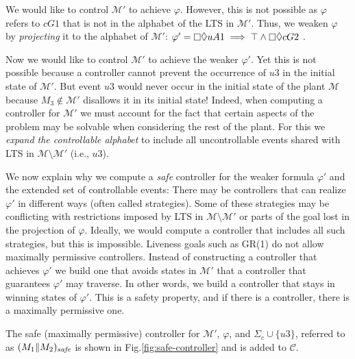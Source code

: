 We would like to  control $\mathcal{M}'$ to achieve $\varphi$. However, 
this is not possible as $\varphi$ refers to $cG1$ that is  not in the alphabet of the LTS in 
$\mathcal{M}'$. Thus, we weaken $\varphi$  by \textit{projecting} it to the alphabet of 
$\mathcal{M}'$:  $\varphi' = \always\eventually uA1 \implies \top 
\wedge \always\eventually cG2$ .%
 
 Now we would like to control $\mathcal{M}'$ to achieve the weaker 
  $\varphi'$. Yet this is not 
  possible because a controller cannot prevent the occurrence of $u3$ in the initial state 
  of $\mathcal{M}'$. 
 But event $u3$ would never occur in the initial state of the plant $\mathcal{M}$ 
 because $M_3 \not\in \mathcal{M'}$ disallows it in its initial state!  Indeed, when 
 computing a controller for $\mathcal{M'}$ we must account for the fact that certain 
 aspects of the problem may be solvable when considering the rest of the plant. For this 
 we \textit{expand the controllable alphabet} to include all uncontrollable events shared 
 with LTS 
 in $\mathcal{M} \setminus \mathcal{M'}$ (i.e., $u3$).
  

  
  We now explain why we compute a \textit{safe} controller for the weaker formula $\varphi'$ 
  and the extended set of controllable events:   There may be controllers that can realize 
  $\varphi'$ in different ways (often called strategies). Some of these strategies may be 
  conflicting with restrictions imposed by LTS in $\mathcal{M} \setminus \mathcal{M'}$ 
  or parts of the goal lost in the projection of $\varphi$.  Ideally, we would compute a 
  controller that includes all such strategies, but this is impossible. Liveness goals such as 
  GR(1) do not allow maximally permissive controllers. Instead  of constructing a 
  controller that achieves $\varphi'$ we build one that avoids states in $\mathcal{M}'$ 
  that a controller that guarantees   $\varphi'$ may traverse. In other words, we build a 
  controller that stays in winning states of $\varphi'$. This is a safety property, and if 
  there is a controller, there is a maximally permissive one. 
  
  The safe (maximally permissive) controller for $\mathcal{M'}$, $\varphi$, and 
  $\Sigma_c \cup \{u3\}$, referred to as $(M_1 \| M_2)_{\mbox{\textit{\scriptsize 
  safe}}}$    is 
  shown in 
  Fig.\ref{fig:safe-controller} 
  and is added to $\mathcal{C}$.
  
